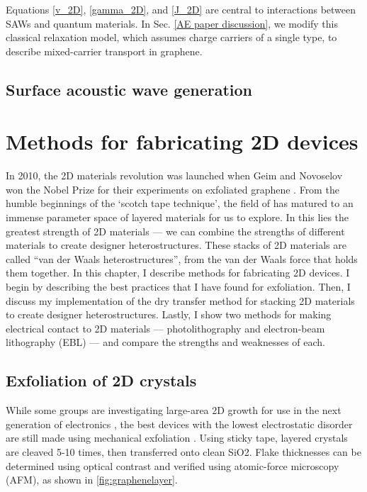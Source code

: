 \documentclass[double,12pt,1in]{beavtex}
\begin{document}
Equations \ref{v_2D}, \ref{gamma_2D}, and \ref{J_2D} are central to interactions between SAWs and quantum materials. In Sec. \ref{AE paper discussion}, we modify this classical relaxation model, which assumes charge carriers of a single type, to describe mixed-carrier transport in graphene.


\section{Surface acoustic wave generation}








\chapter{Methods for fabricating 2D devices}

In 2010, the 2D materials revolution was launched when Geim and Novoselov won the Nobel Prize for their experiments on exfoliated graphene \cite{novoselov_electric_2004}. From the humble beginnings of the ‘scotch tape technique’, the field of has matured to an immense parameter space of layered materials for us to explore. In this lies the greatest strength of 2D materials — we can combine the strengths of different materials to create designer heterostructures. These stacks of 2D materials are called “van der Waals heterostructures”, from the van der Waals force that holds them together. In this chapter, I describe methods for fabricating 2D devices. I begin by describing the best practices that I have found for exfoliation. Then, I discuss my implementation of the dry transfer method for stacking 2D materials to create designer heterostructures. Lastly, I show two methods for making electrical contact to 2D materials — photolithography and electron-beam lithography (EBL) — and compare the strengths and weaknesses of each.


\section{Exfoliation of 2D crystals}

While some groups are investigating large-area 2D growth for use in the next generation of electronics \cite{quellmalz_large-area_2021}, the best devices with the lowest electrostatic disorder are still made using mechanical exfoliation \cite{xin_giant_2023}. Using sticky tape, layered crystals are cleaved 5-10 times, then transferred onto clean SiO2. Flake thicknesses can be determined using optical contrast and verified using atomic-force microscopy (AFM), as shown in \ref*{fig:graphenelayer}.
\end{document}
